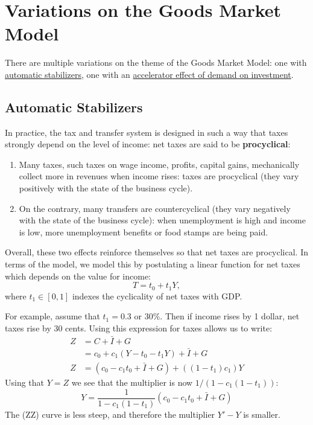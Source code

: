 \documentclass[]{book}
\theoremstyle{definition}
\theoremstyle{definition}
\theoremstyle{definition}
\theoremstyle{remark}
\begin{document}
\hypertarget{variations}{\section{Variations on the Goods Market
Model}\label{variations}}

There are multiple variations on the theme of the Goods Market Model:
one with \protect\hyperlink{automatic}{automatic stabilizers}, one with
an \protect\hyperlink{accelerator}{accelerator effect of demand on
investment}.

\hypertarget{automatic}{\subsection{Automatic
Stabilizers}\label{automatic}}

In practice, the tax and transfer system is designed in such a way that
taxes strongly depend on the level of income: net taxes are said to be
\textbf{procyclical}:

\begin{enumerate}
\def\labelenumi{\arabic{enumi}.}
\item
  Many taxes, such taxes on wage income, profits, capital gains,
  mechanically collect more in revenues when income rises: taxes are
  procyclical (they vary positively with the state of the business
  cycle).
\item
  On the contrary, many transfers are countercyclical (they vary
  negatively with the state of the business cycle): when unemployment is
  high and income is low, more unemployment benefits or food stamps are
  being paid.
\end{enumerate}

Overall, these two effects reinforce themselves so that net taxes are
procyclical. In terms of the model, we model this by postulating a
linear function for net taxes which depends on the value for income:
\[T=t_{0}+t_{1}Y,\] where \(t_1 \in [0,1]\) indexes the cyclicality of
net taxes with GDP.

For example, assume that \(t_1=0.3\) or 30\%. Then if income rises by 1
dollar, net taxes rise by 30 cents. Using this expression for taxes
allows us to write: \[
\begin{aligned}
Z   &=C+\bar{I}+G\\
    &=c_{0}+c_{1}\left(Y-t_{0}-t_{1}Y\right)+\bar{I}+G\\
Z   &=\left(c_{0}-c_{1}t_{0}+\bar{I}+G\right)+\left(\left(1-t_{1}\right)c_{1}\right)Y
\end{aligned}
\] Using that \(Y=Z\) we see that the multiplier is now
\(1/(1-c_1(1-t_1))\):
\[Y=\frac{1}{1-c_{1}\left(1-t_{1}\right)}\left(c_{0}-c_{1}t_{0}+\bar{I}+G\right)\]
The (ZZ) curve is less steep, and therefore the multiplier \(Y'-Y\) is
smaller.
\end{document}
